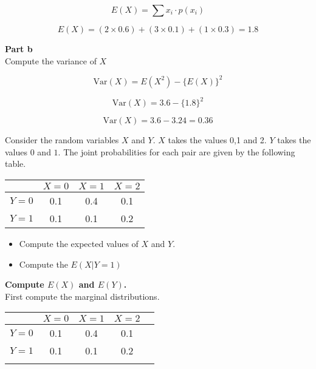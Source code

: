 \documentclass[]{report}
\begin{document}
	\[ E(X) =  \sum  x_i \cdot p(x_i)   \]
	
	
	
	
	
	
	
	
	
	
	\[E(X) = (2\times 0.6) + (3 \times 0.1) + (1 \times 0.3) = 1.8 \]
	
	
	
	
	
	
	
	
	\textbf{Part b}\\
	Compute the variance of $X$
	
	\[ \mbox{Var}(X) = E(X^2) - \{E(X)\}^2 \]
	
	\[ \mbox{Var}(X) = 3.6 - \{1.8\}^2 \]

	
	\[ \mbox{Var}(X) = 3.6 - 3.24  = \boldsymbol{0.36} \]
	
	
	
	
	Consider the random variables $X$ and $Y$. $X$ takes the values 0,1 and 2. $Y$ takes the values $0$ and $1$.
	The joint probabilities for each pair are given by the following table.
	\begin{center}
		\begin{tabular}{|c|c|c|c|}
			\hline  & $X=0$ & $X=1$ & $X=2$  \\ 
			\hline $Y=0$ & 0.1  & 0.4 & 0.1 \\ 
			\hline  $Y=1$ & 0.1 & 0.1 & 0.2 \\ 
			\hline 
		\end{tabular} 
	\end{center}
	\begin{itemize}
		\item Compute the expected values of $X$ and $Y$.
		\item Compute the $E(X|Y=1)$
	\end{itemize}
	
	
	
	
	
	
	
	\textbf{Compute $E(X)$ and $E(Y)$.}\\
	First compute the marginal distributions.
	
	\begin{center}
		\begin{tabular}{|c|c|c|c||c|}
			\hline  & $X=0$ & $X=1$ & $X=2$  &\phantom{spaces}\\ 
			\hline $Y=0$ & 0.1  & 0.4 & 0.1 &\\ 
			\hline  $Y=1$ & 0.1 & 0.1 & 0.2 & \\ \hline
			\hline & & & & \\
			\hline 
		\end{tabular} 
	\end{center}
	
\end{document}
